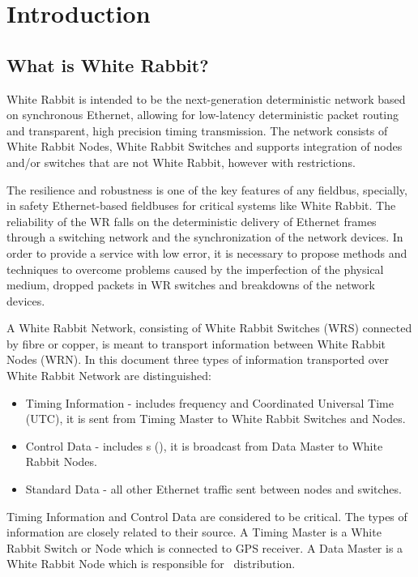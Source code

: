 \chapter{Introduction}
\label{introduction}

\section{What is White Rabbit?} 

White Rabbit is intended to be the next-generation deterministic network based
on synchronous Ethernet, allowing for low-latency deterministic packet routing
and transparent, high precision timing transmission. The network consists of
White Rabbit Nodes, White Rabbit Switches and supports integration of nodes
and/or switches that are not White Rabbit, however with restrictions.


The resilience and robustness is one of the key features of any
fieldbus, specially, in safety Ethernet-based fieldbuses for critical systems
like White Rabbit. The reliability of the WR falls on the deterministic delivery
of Ethernet frames through a switching network and the synchronization of the
network devices. In order to provide a service with low error, it is necessary
to propose methods and techniques to overcome problems caused by the
imperfection of the physical medium, dropped packets in WR switches and
breakdowns of the network devices.


A White Rabbit Network, consisting of White Rabbit Switches (WRS) connected
by fibre or copper, is meant to transport information between White Rabbit
Nodes (WRN). In this document three types of information transported over White
Rabbit Network are distinguished:

\begin{itemize}
  \item  Timing Information - includes frequency and Coordinated Universal
  Time (UTC), it is sent from Timing Master to White Rabbit Switches and Nodes.
  \item  Control Data - includes \ControlMessage s (\CM), it is broadcast from
Data Master to  White Rabbit Nodes. 
  \item  Standard Data - all other Ethernet traffic sent between nodes and
  switches.
\end{itemize}
Timing Information and Control Data are considered to be critical. 
The types of information are closely related to their source. A Timing Master is
a White Rabbit Switch or Node which is connected to GPS receiver. A Data Master
is a White Rabbit Node which is responsible for \ControlMessage\   distribution.


